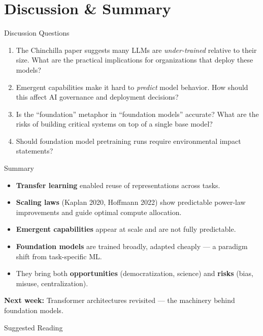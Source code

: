\documentclass[aspectratio=169,10pt]{beamer}
\begin{document}
\section{Discussion \& Summary}

\begin{frame}{Discussion Questions}
  \begin{enumerate}
    \item The Chinchilla paper suggests many LLMs are \emph{under-trained} relative to their size.
          What are the practical implications for organizations that deploy these models?
    \item Emergent capabilities make it hard to \emph{predict} model behavior.
          How should this affect AI governance and deployment decisions?
    \item Is the ``foundation'' metaphor in ``foundation models'' accurate?
          What are the risks of building critical systems on top of a single base model?
    \item Should foundation model pretraining runs require environmental impact statements?
  \end{enumerate}
\end{frame}

\begin{frame}{Summary}
  \begin{itemize}
    \item \textbf{Transfer learning} enabled reuse of representations across tasks.
    \item \textbf{Scaling laws} (Kaplan 2020, Hoffmann 2022) show predictable power-law
          improvements and guide optimal compute allocation.
    \item \textbf{Emergent capabilities} appear at scale and are not fully predictable.
    \item \textbf{Foundation models} are trained broadly, adapted cheaply —
          a paradigm shift from task-specific ML.
    \item They bring both \textbf{opportunities} (democratization, science) and
          \textbf{risks} (bias, misuse, centralization).
  \end{itemize}
  \vspace{0.4em}
  \textbf{Next week:} Transformer architectures revisited — the machinery behind foundation models.
\end{frame}

\begin{frame}[allowframebreaks]{Suggested Reading}
  \nocite{bommasani2021foundation, kaplan2020scaling, hoffmann2022chinchilla,
          wei2022emergent, brown2020language, devlin2019bert}
  
\end{frame}
\end{document}
